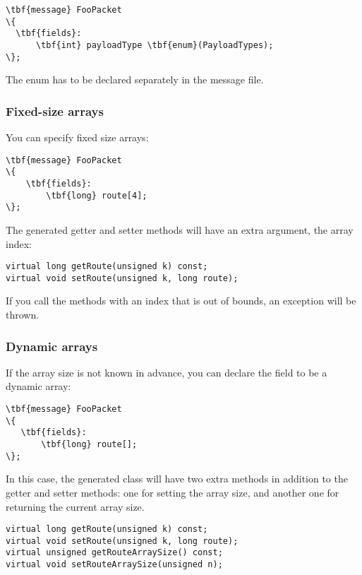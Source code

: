 \begin{Verbatim}[commandchars=\\\{\}]
\tbf{message} FooPacket
\{
  \tbf{fields}:
      \tbf{int} payloadType \tbf{enum}(PayloadTypes);
\};
\end{Verbatim}

The enum has to be declared separately in the message file.


\subsubsection{Fixed-size arrays}

You can specify fixed size arrays:

\begin{Verbatim}[commandchars=\\\{\}]
\tbf{message} FooPacket
\{
    \tbf{fields}:
        \tbf{long} route[4];
\};
\end{Verbatim}

The generated getter and setter methods will have an extra  argument,
the array index:

\begin{verbatim}
virtual long getRoute(unsigned k) const;
virtual void setRoute(unsigned k, long route);
\end{verbatim}

If you call the methods with an index that is out of bounds, an exception
will be thrown.


\subsubsection{Dynamic arrays}

If the array size is not known in advance, you can declare the field
to be a dynamic array:

\begin{Verbatim}[commandchars=\\\{\}]
\tbf{message} FooPacket
\{
   \tbf{fields}:
       \tbf{long} route[];
\};
\end{Verbatim}

In this case, the generated class will have two extra methods in addition
to the getter and setter methods: one for setting the array size, and another
one for returning the current array size.

\begin{verbatim}
virtual long getRoute(unsigned k) const;
virtual void setRoute(unsigned k, long route);
virtual unsigned getRouteArraySize() const;
virtual void setRouteArraySize(unsigned n);
\end{verbatim}

